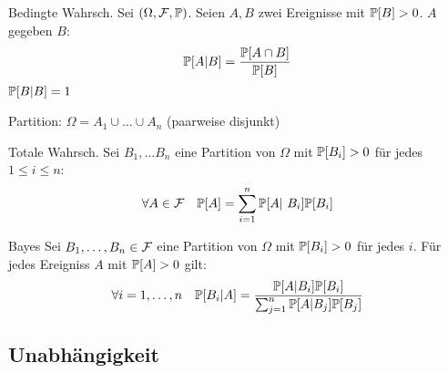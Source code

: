 \begin{tprop}{Bedingte Wahrsch.}
	Sei $(\Omega, \mathcal{F} , \mathbb{P})$. Seien $A,B$ zwei Ereignisse mit $\mathbb{P} [B] > 0$. $A$ gegeben $B$: 
	\begin{equation*}
		\mathbb{P} [A | B] = \frac{\mathbb{P} [A \cap B]}{\mathbb{P} [B]} 
	\end{equation*}
	$\mathbb{P} [B|B] = 1$
\end{tprop}
Partition: $\Omega = A_1 \cup \ldots \cup A_n$ (paarweise disjunkt)
\begin{tprop}{Totale Wahrsch.}
	Sei $B_1 , \ldots B_n$ eine Partition von $\Omega$ mit $\mathbb{P} [B_i] > 0$ für jedes $1 \leq i \leq n$:
	\begin{equation*}
		\forall A \in \F \quad \pr [A] = \sum_{i=1}^{n} \pr [A | B_i] \pr [B_i]
	\end{equation*}
\end{tprop}
\begin{tprop}{Bayes}
	Sei $B_1, \ldots , B_n \in \mathcal{F}$ eine Partition von $\Omega$ mit $\mathbb{P} [B_i] > 0$ für jedes $i$. Für jedes Ereigniss $A$
	mit $\mathbb{P} [A]> 0$ gilt:
	\begin{equation*}
		\forall i = 1, \ldots , n \quad \mathbb{P} [B_i | A] = \frac{\mathbb{P} [A | B_i] \mathbb{P} [B_i]}{\sum_{j=1}^{n} \mathbb{P} [A | B_j] \mathbb{P}
		[B_j]} 
	\end{equation*}
\end{tprop}


\subsection{Unabhängigkeit}%
\label{sub:unabhangigkeit}

